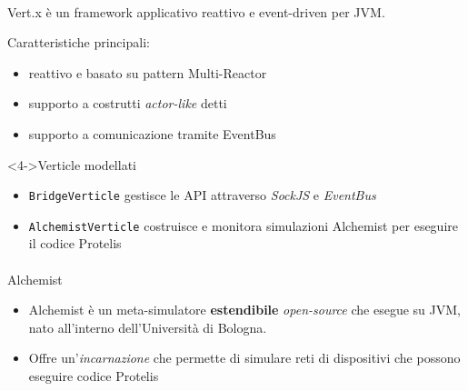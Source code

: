     \begin{frame}{\insertsectionhead}
      \framesubtitle{\insertsubsectionhead}

      \begin{block}{Vert.x}
         è un framework applicativo reattivo e event-driven per JVM.

        Caratteristiche principali:
        \begin{itemize}
          \item<1-> reattivo e basato su pattern Multi-Reactor
          \item<2-> supporto a costrutti \emph{actor-like} detti 
          \item<3-> supporto a comunicazione tramite EventBus
        \end{itemize}

      \end{block}


      \begin{block}<4->{Verticle modellati}
        \begin{itemize}
          \item \texttt{BridgeVerticle} gestisce le API attraverso \emph{SockJS} e \emph{EventBus}
          \item \texttt{AlchemistVerticle} costruisce e monitora simulazioni Alchemist per eseguire il codice Protelis
        \end{itemize}
      \end{block}
    \end{frame}

    \begin{frame}{\insertsectionhead}
      \framesubtitle{\insertsubsectionhead}

      \begin{block}{Alchemist}
        \begin{itemize}
          \item<1-> Alchemist è un meta-simulatore \textbf<2->{estendibile} \emph{open-source} che esegue su JVM, nato all'interno dell'Università di Bologna.
          \item<2-> Offre un'\emph{incarnazione} che permette di simulare reti di dispositivi che possono eseguire codice Protelis
        \end{itemize}
      \end{block}
    \end{frame}

